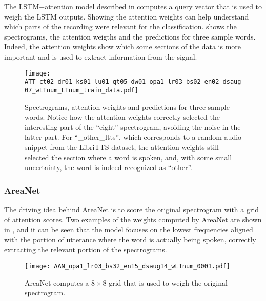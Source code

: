 
The LSTM+attention model described in  computes a query
vector that is used to weigh the LSTM outputs. Showing the attention weights
can help understand which parts of the recording were relevant for the
classification.
 shows the spectrograms, the attention
weigths and the predictions for three sample words.
Indeed, the attention weights show which some sections of the data is more important
and is used to extract information from the signal.

\begin{figure*}[t!]
    \centering
    \texttt{[image: ATT\_ct02\_dr01\_ks01\_lu01\_qt05\_dw01\_opa1\_lr03\_bs02\_en02\_dsaug07\_wLTnum\_LTnum\_train\_data.pdf]}
    \caption{Spectrograms, attention weights and predictions for three sample words.
    Notice how the attention weights correctly selected the interesting part of
    the ``eight'' spectrogram, avoiding the noise in the latter part.
    For ``\_other\_ltts'', which corresponds to a random audio snippet from the LibriTTS
    dataset, the attention weights still selected the section where a word is spoken,
    and, with some small uncertainty, the word is indeed recognized as ``other''.}%
    \label{fig:attention_weights_standard}
\end{figure*}

\subsubsection{AreaNet}

The driving idea behind AreaNet is to score the original spectrogram with a
grid of attention scores. Two examples of the weights computed by AreaNet are
shown in , and it can be seen that the model
focuses on the lowest frequencies aligned with the portion of utterance where
the word is actually being spoken, correctly extracting the relevant portion 
of the spectrograms.

\begin{figure}[t!]
    \centering
    \texttt{[image: AAN\_opa1\_lr03\_bs32\_en15\_dsaug14\_wLTnum\_0001.pdf]}
    \caption{AreaNet computes a $8 \times 8$ grid that is used to weigh the
    original spectrogram.}%
    \label{fig:attention_weights_area}
\end{figure}

